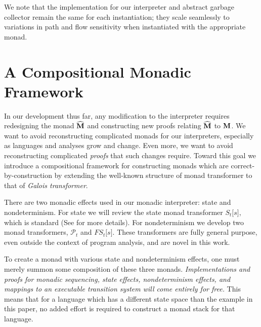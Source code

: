 \par

We note that the implementation for our interpreter and abstract garbage
collector remain the same for each instantiation; they scale seamlessly
to variations in path and flow sensitivity when instantiated with the
appropriate monad.

\par

\section{A Compositional Monadic
Framework}\label{a-compositional-monadic-framework}

\par

In our development thus far, any modification to the interpreter
requires redesigning the monad $ \widehat{\mathtt{\mathbf{M}}} $ and constructing new
proofs relating $ \widehat{\mathtt{\mathbf{M}}} $ to $ \mathtt{\mathbf{M}} $. We want to
avoid reconstructing complicated monads for our interpreters, especially
as languages and analyses grow and change. Even more, we want to avoid
reconstructing complicated \emph{proofs} that such changes require.
Toward this goal we introduce a compositional framework for constructing
monads which are correct-by-construction by extending the well-known
structure of monad transformer to that of \emph{Galois transformer}.

\par

There are two monadic effects used in our monadic interpreter: state and
nondeterminism. For state we will review the state monad transformer
$S _t  \lbrack s \rbrack $, which is standard (See
\citet{dvanhorn:Liang1995Monad} for more details). For nondeterminism we
develop two monad transformers, $ \mathcal{P}  _t $ and
$FS _t  \lbrack s \rbrack $. These transformers are fully general
purpose, even outside the context of program analysis, and are novel in
this work.

\par

To create a monad with various state and nondeterminism effects, one
must merely summon some composition of these three monads.
\emph{Implementations and proofs for monadic sequencing, state effects,
nondeterminism effects, and mappings to an executable transition system
will come entirely for free.} This means that for a language which has a
different state space than the example in this paper, no added effort is
required to construct a monad stack for that language.

